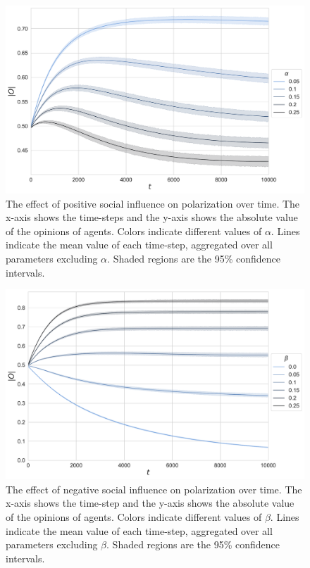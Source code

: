 \documentclass[11pt]{article}
\begin{document}
\begin{figure}[H]
    \centering
    \includegraphics[width=.7\linewidth]{../plots/overall/Absolute_Opinion_Positive_Learning_Rate.pdf}
  \caption{The effect of positive social influence on polarization over time. The x-axis shows the time-steps and the y-axis shows the absolute value of the opinions of agents. Colors indicate different values of $\alpha$. Lines indicate the mean value of each time-step, aggregated over all parameters excluding $\alpha$. Shaded regions are the 95\% confidence intervals.}
  \label{appendix:alpha}
\end{figure}

\begin{figure}[H]
    \centering
    \includegraphics[width=.7\linewidth]{../plots/overall/Absolute_Opinion_Negative_Learning_Rate.pdf}
  \caption{The effect of negative social influence on polarization over time. The x-axis shows the time-step and the y-axis shows the absolute value of the opinions of agents. Colors indicate different values of $\beta$. Lines indicate the mean value of each time-step, aggregated over all parameters excluding $\beta$. Shaded regions are the 95\% confidence intervals.}
  \label{appendix:beta}
\end{figure}
\end{document}
